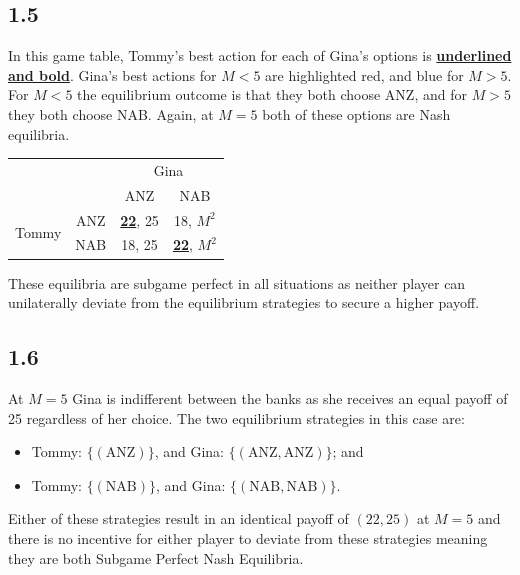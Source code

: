 \documentclass{article}
\begin{document}
\subsection*{1.5} In this game table, Tommy's best action for each of Gina's options is \underline{\textbf{underlined and bold}}. Gina's best actions for $M<5$ are highlighted {\color{red}red}, and {\color{blue}blue} for $M>5$. For $M<5$ the equilibrium outcome is that they both choose ANZ, and for $M>5$ they both choose NAB. Again, at $M=5$ both of these options are Nash equilibria.\\
\begin{table}[ht]
    \centering
    \begin{tabular}{cccc}
                                                    &                          & \multicolumn{2}{c}{Gina}                                     \\ \cline{3-4} 
                                                    & \multicolumn{1}{c|}{}    & \multicolumn{1}{c|}{ANZ}    & \multicolumn{1}{c|}{NAB}       \\ \cline{2-4} 
        \multicolumn{1}{c|}{\multirow{2}{*}{Tommy}} & \multicolumn{1}{c|}{ANZ} & \multicolumn{1}{c|}{\underline{\textbf{22}}, {\color{red}25}} & \multicolumn{1}{c|}{18, {\color{blue}$M^2$}} \\ \cline{2-4} 
        \multicolumn{1}{c|}{}                       & \multicolumn{1}{c|}{NAB} & \multicolumn{1}{c|}{18, {\color{red}25}} & \multicolumn{1}{c|}{\underline{\textbf{22}}, {\color{blue}$M^2$}} \\ \cline{2-4} 
    \end{tabular}
\end{table}
These equilibria are subgame perfect in all situations as neither player can unilaterally deviate from the equilibrium strategies to secure a higher payoff.
\subsection*{1.6}
At $M=5$ Gina is indifferent between the banks as she receives an equal payoff of 25 regardless of her choice. The two equilibrium strategies in this case are:
\begin{itemize}
    \item Tommy: $\{(\mbox{ANZ})\}$, and Gina: $\{(\mbox{ANZ}, \mbox{ANZ})\}$; and
    \item Tommy: $\{(\mbox{NAB})\}$, and Gina: $\{(\mbox{NAB}, \mbox{NAB})\}$.
\end{itemize}
Either of these strategies result in an identical payoff of $(22,25)$ at $M=5$ and there is no incentive for either player to deviate from these strategies meaning they are both Subgame Perfect Nash Equilibria.
\end{document}
